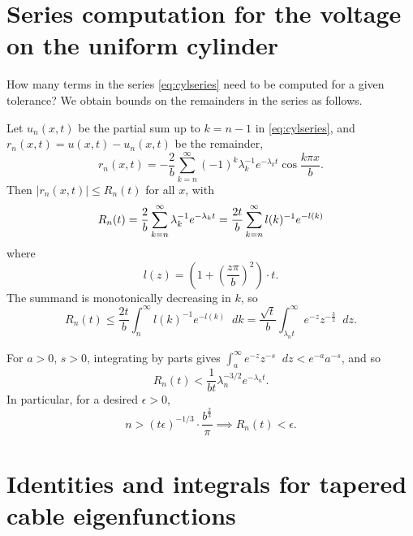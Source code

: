 \documentclass[parskip=half]{scrartcl}
\newcommand{\Int}[2]{\int_{#1}^{#2}\!}
\newcommand{\D}{\mathop{}\!d}
\theoremstyle{nonumberplain}
\begin{document}
\newpage
\appendix
\section{Series computation for the voltage on the uniform cylinder}
\label{ap:cylcomp}

How many terms in the series \eqref{eq:cylseries} need to be computed for a given tolerance?
We obtain bounds on the remainders in the series as follows.

Let $u_n(x,t)$ be the partial sum up to $k=n-1$ in \eqref{eq:cylseries}, and $r_n(x,t) = u(x,t) - u_n(x,t)$
be the remainder,
\begin{equation}
    r_n(x,t) = -\frac{2}{b}\sum_{k=n}^{\infty} (-1)^k\lambda_k^{-1}e^{-\lambda_k t}\cos\frac{k\pi x}{b}.
\end{equation}
Then $|r_n(x,t)|\leq R_n(t)$ for all $x$, with
\begin{equation}
    R_n(t) = \frac{2}{b}\sum_{k=n}^{\infty} \lambda_k^{-1}e^{-\lambda_k t}\\
    = \frac{2t}{b}\sum_{k=n}^{\infty} l(k)^{-1}e^{-l(k)}\\
\end{equation}
where
\[
    l(z) = \left(1+\left(\frac{z\pi}{b}\right)^2\right)\cdot t.
\]
The summand is monotonically decreasing in $k$, so
\begin{equation}
    \label{eq:rnigamma}
    R_n(t)
    \leq \frac{2t}{b}\Int{n}{\infty} l(k)^{-1}e^{-l(k)}\D k
    = \frac{\sqrt{t}}{b} \Int{\lambda_n t}{\infty} e^{-z}z^{-\frac{3}{2}} \D z.
\end{equation}

For $a>0$, $s>0$, integrating by parts gives
$\displaystyle \Int{a}{\infty} e^{-z}z^{-s}\D z < e^{-a}a^{-s}$,
and so
\begin{equation}
    R_n(t) < \frac{1}{b t}\lambda_n^{-3/2}e^{-\lambda_n t}.
\end{equation}
In particular, for a desired $\epsilon>0$,
\begin{equation}
    n > (t \epsilon)^{-1/3}\cdot\frac{b^\frac{2}{3}}{\pi}
    \implies
    R_n(t) < \epsilon.
\end{equation}

\section{Identities and integrals for tapered cable eigenfunctions}
\label{ap:conid}

\newcommand{\Fp}{\smash{F^{\mathrlap{\prime}}}\mkern-2.0mu}
\newcommand{\Gp}{\smash{G^{\mathrlap{\prime}}}\mkern-2.0mu}
\end{document}
